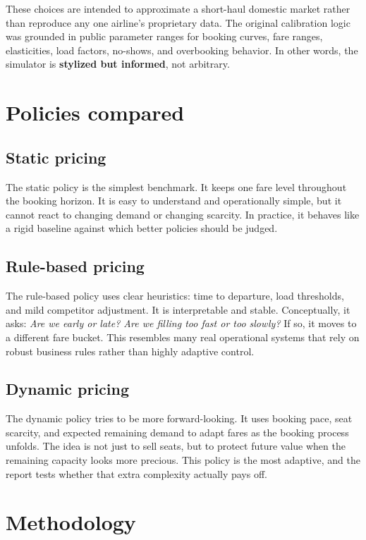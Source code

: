 \documentclass[11pt,a4paper]{article}
\begin{document}
These choices are intended to approximate a short-haul domestic market rather than reproduce any one airline's proprietary data. The original calibration logic was grounded in public parameter ranges for booking curves, fare ranges, elasticities, load factors, no-shows, and overbooking behavior. In other words, the simulator is \textbf{stylized but informed}, not arbitrary.

\section{Policies compared}

\subsection{Static pricing}

The static policy is the simplest benchmark. It keeps one fare level throughout the booking horizon. It is easy to understand and operationally simple, but it cannot react to changing demand or changing scarcity. In practice, it behaves like a rigid baseline against which better policies should be judged.

\subsection{Rule-based pricing}

The rule-based policy uses clear heuristics: time to departure, load thresholds, and mild competitor adjustment. It is interpretable and stable. Conceptually, it asks: \emph{Are we early or late? Are we filling too fast or too slowly?} If so, it moves to a different fare bucket. This resembles many real operational systems that rely on robust business rules rather than highly adaptive control.

\subsection{Dynamic pricing}

The dynamic policy tries to be more forward-looking. It uses booking pace, seat scarcity, and expected remaining demand to adapt fares as the booking process unfolds. The idea is not just to sell seats, but to protect future value when the remaining capacity looks more precious. This policy is the most adaptive, and the report tests whether that extra complexity actually pays off.

\section{Methodology}
\end{document}
